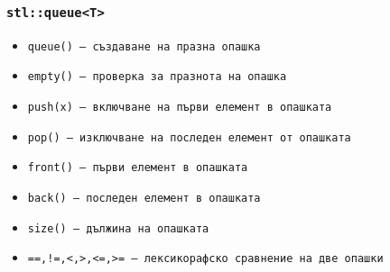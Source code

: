 \documentclass{beamer}
\begin{document}
\begin{frame}
  \frametitle{\tt{stl::queue<T>}}

  \begin{itemize}
  \item \tt{queue()} --- създаване на празна опашка
  \item \tt{empty()} --- проверка за празнота на опашка
  \item \tt{push(x)} --- включване на първи елемент в опашката
  \item \tt{pop()} --- изключване на последен елемент от опашката
  \item \tt{front()} --- първи елемент в опашката
  \item \tt{back()} --- последен елемент в опашката
  \item \tt{size()} --- дължина на опашката
  \item \tt{==,!=,<,>,<=,>=} --- лексикорафско сравнение на две опашки
  \end{itemize}
\end{frame}
\end{document}
